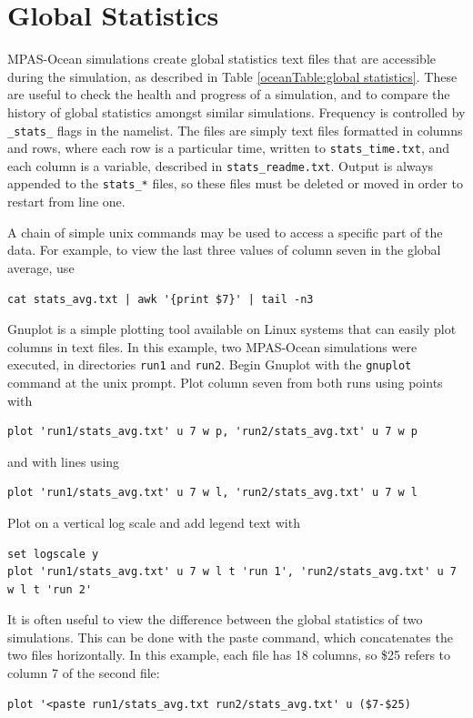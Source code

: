 \section{Global Statistics}
\label{sec:global_statistics}

MPAS-Ocean simulations create global statistics text files that are accessible during the simulation, as described in Table \ref{oceanTable:global statistics}.  These are useful to check the health and progress of a simulation, and to compare the history of global statistics amongst similar simulations.  Frequency is controlled by \verb|_stats_| flags in the namelist.  The files are simply text files formatted in columns and rows, where each row is a particular time, written to \verb|stats_time.txt|, and each column is a variable, described in \verb|stats_readme.txt|.  Output is always appended to the {\tt stats\_*} files, so these files must be deleted or moved in order to restart from line one.

A chain of simple unix commands may be used to access a specific part of the data.  For example, to view the last three values of column seven in the global average, use
\begin{verbatim}
cat stats_avg.txt | awk '{print $7}' | tail -n3
\end{verbatim}
Gnuplot is a simple plotting tool available on Linux systems that can easily plot columns in text files.  In this example, two MPAS-Ocean simulations were executed, in directories \verb|run1| and \verb|run2|.  Begin Gnuplot with the \verb|gnuplot| command at the unix prompt.  Plot column seven from both runs using points with
\begin{verbatim}
plot 'run1/stats_avg.txt' u 7 w p, 'run2/stats_avg.txt' u 7 w p
\end{verbatim}
and with lines using
\begin{verbatim}
plot 'run1/stats_avg.txt' u 7 w l, 'run2/stats_avg.txt' u 7 w l
\end{verbatim}
Plot on a vertical log scale and add legend text with
\begin{verbatim}
set logscale y
plot 'run1/stats_avg.txt' u 7 w l t 'run 1', 'run2/stats_avg.txt' u 7 w l t 'run 2'
\end{verbatim}
It is often useful to view the difference between the global statistics of two simulations.  This can be done with the paste command, which concatenates the two files horizontally.  In this example, each file has 18 columns, so \$25 refers to column 7 of the second file:
\begin{verbatim}
plot '<paste run1/stats_avg.txt run2/stats_avg.txt' u ($7-$25)
\end{verbatim}

